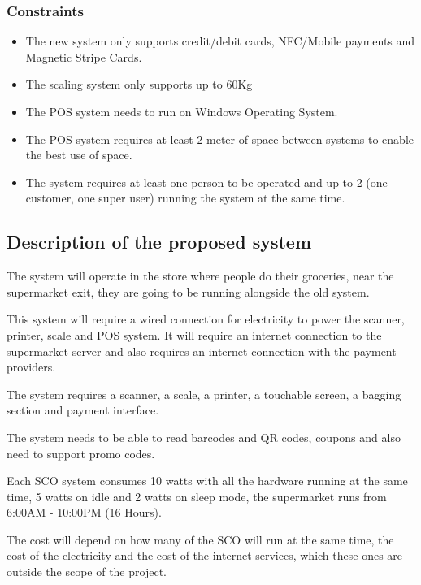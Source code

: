 \subsubsection{Constraints}
\begin{itemize}
    \item The new system only supports credit/debit cards, NFC/Mobile 
    payments and Magnetic Stripe Cards.
    \item The scaling system only supports up to 60Kg
    \item The POS system needs to run on Windows Operating System.
    \item The POS system requires at least 2 meter of space between systems 
    to enable the best use of space.
    \item The system requires at least one person to be operated and up 
    to 2 (one customer, one super user) running the system at the same time.
\end{itemize}

\subsection{Description of the proposed system}

The system will operate in the store where people do their groceries, 
near the supermarket exit, they are going to be running 
alongside the old system. \newline

This system will require a wired connection for electricity to power the 
scanner, printer, scale and POS system. It will require an internet connection 
to the supermarket server and also requires an internet connection with the 
payment providers. \newline

The system requires a scanner, a scale, a printer, a touchable screen, a 
bagging section and payment interface. \newline

The system needs to be able to read barcodes and QR codes, coupons and also 
need to support promo codes. \newline

Each SCO system consumes 10 watts with all the hardware running at the same 
time, 5 watts on idle and 2 watts on sleep mode, the supermarket 
runs from 6:00AM - 10:00PM (16 Hours). \newline

The cost will depend on how many of the SCO will run at the same time, the 
cost of the electricity and the cost of the internet services, which these 
ones are outside the scope of the project. \newline

